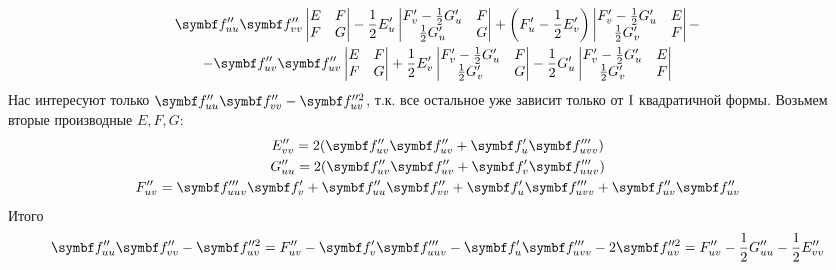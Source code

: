 \documentclass[main]{subfiles}
\begin{document}
\begin{longProof}
\begin{multline*}
        \vf''_{uu} \vf''_{vv} \begin{vmatrix}
            E & F \\
            F & G
        \end{vmatrix}
        - \frac{1}{2} E'_u \begin{vmatrix}
            F'_v - \frac{1}{2}G'_u & F \\
            \frac{1}{2}G'_u        & G
        \end{vmatrix}
        + \left(F'_u - \frac{1}{2} E'_v\right) \begin{vmatrix}
            F'_v - \frac{1}{2} G'_u & E \\
            \frac{1}{2}G'_v         & F
        \end{vmatrix}-\\
        - \vf''_{uv} \vf''_{uv} \begin{vmatrix}
            E & F \\
            F & G
        \end{vmatrix}
        + \frac{1}{2} E'_v \begin{vmatrix}
            F'_v - \frac{1}{2}G'_u & F \\
            \frac{1}{2}G'_v        & G
        \end{vmatrix}
        - \frac{1}{2} G'_u \begin{vmatrix}
            F'_v - \frac{1}{2}G'_u & E \\
            \frac{1}{2}G'_v        & F
        \end{vmatrix}
    \end{multline*}
    Нас интересуют только $\vf''_{uu}\vf''_{vv} - \vf''^2_{uv}$, т.к. все остальное уже зависит только от $\mathrm{I}$ квадратичной формы.
    Возьмем вторые производные $E,F,G$:
    \begin{gather*}
        E''_{vv} = 2 (\vf''_{uv} \vf''_{uv} + \vf'_u \vf'''_{uvv})\\
        G''_{uu} = 2 (\vf''_{uv} \vf''_{uv} + \vf'_v \vf'''_{uuv})\\
        F''_{uv} = \vf'''_{uuv} \vf'_v + \vf''_{uu} \vf''_{vv} + \vf'_u \vf'''_{uvv} + \vf''_{uv} \vf''_{uv}\\
    \end{gather*}
    Итого
    \[\vf''_{uu}\vf''_{vv} - \vf''^2_{uv} = F''_{uv}- \vf'_v\vf'''_{uuv} - \vf'_u \vf'''_{uvv} - 2 \vf''^2_{uv} = F''_{uv} - \frac{1}{2}G''_{uu} - \frac{1}{2} E''_{vv}\]
\end{longProof}
\end{document}
